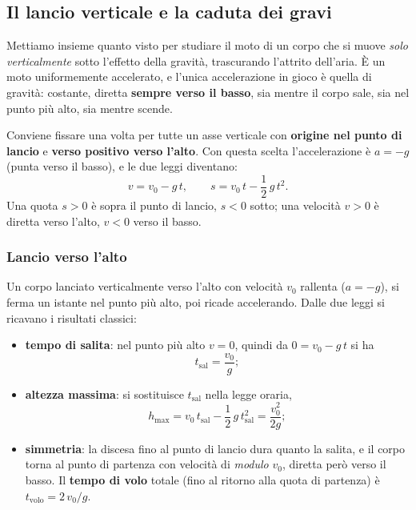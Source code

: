 \subsection{Il lancio verticale e la caduta dei gravi}
Mettiamo insieme quanto visto per studiare il moto di un corpo che si muove \emph{solo verticalmente} sotto l'effetto della gravità, trascurando l'attrito dell'aria. È un moto uniformemente accelerato, e l'unica accelerazione in gioco è quella di gravità: costante, diretta \textbf{sempre verso il basso}, sia mentre il corpo sale, sia nel punto più alto, sia mentre scende.

\begin{remark}
Conviene fissare una volta per tutte un asse verticale con \textbf{origine nel punto di lancio} e \textbf{verso positivo verso l'alto}. Con questa scelta l'accelerazione è $a = -g$ (punta verso il basso), e le due leggi diventano:
\[ v = v_0 - g\,t, \qquad s = v_0\,t - \frac{1}{2}\,g\,t^2. \]
Una quota $s > 0$ è sopra il punto di lancio, $s < 0$ sotto; una velocità $v > 0$ è diretta verso l'alto, $v < 0$ verso il basso.
\end{remark}

\subsubsection{Lancio verso l'alto}
Un corpo lanciato verticalmente verso l'alto con velocità $v_0$ rallenta ($a = -g$), si ferma un istante nel punto più alto, poi ricade accelerando. Dalle due leggi si ricavano i risultati classici:
\begin{itemize}
    \item \textbf{tempo di salita}: nel punto più alto $v = 0$, quindi da $0 = v_0 - g\,t$ si ha
    \[ t_\text{sal} = \frac{v_0}{g}; \]
    \item \textbf{altezza massima}: si sostituisce $t_\text{sal}$ nella legge oraria,
    \[ h_\text{max} = v_0\,t_\text{sal} - \frac{1}{2}\,g\,t_\text{sal}^2 = \frac{v_0^2}{2g}; \]
    \item \textbf{simmetria}: la discesa fino al punto di lancio dura quanto la salita, e il corpo torna al punto di partenza con velocità di \emph{modulo} $v_0$, diretta però verso il basso. Il \textbf{tempo di volo} totale (fino al ritorno alla quota di partenza) è $t_\text{volo} = 2\,v_0/g$.
\end{itemize}

